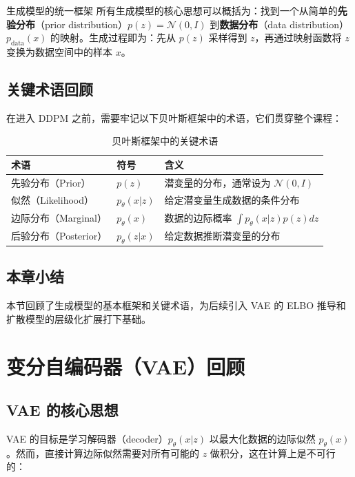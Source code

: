 \documentclass[a4paper]{article}
\begin{document}
\begin{knowledgebox}{生成模型的统一框架}
所有生成模型的核心思想可以概括为：找到一个从简单的\textbf{先验分布}（prior distribution）$p(z) = \mathcal{N}(0, I)$ 到\textbf{数据分布}（data distribution）$p_{\text{data}}(x)$ 的映射。生成过程即为：先从 $p(z)$ 采样得到 $z$，再通过映射函数将 $z$ 变换为数据空间中的样本 $x$。
\end{knowledgebox}

\subsection{关键术语回顾}

在进入 DDPM 之前，需要牢记以下贝叶斯框架中的术语，它们贯穿整个课程：

\begin{table}[H]
\centering
\begin{tabular}{lll}
\toprule
\textbf{术语} & \textbf{符号} & \textbf{含义} \\
\midrule
先验分布（Prior） & $p(z)$ & 潜变量的分布，通常设为 $\mathcal{N}(0, I)$ \\
似然（Likelihood） & $p_\theta(x|z)$ & 给定潜变量生成数据的条件分布 \\
边际分布（Marginal） & $p_\theta(x)$ & 数据的边际概率 $\int p_\theta(x|z)p(z)dz$ \\
后验分布（Posterior） & $p_\theta(z|x)$ & 给定数据推断潜变量的分布 \\
\bottomrule
\end{tabular}
\caption{贝叶斯框架中的关键术语}
\end{table}

\subsection{本章小结}

本节回顾了生成模型的基本框架和关键术语，为后续引入 VAE 的 ELBO 推导和扩散模型的层级化扩展打下基础。


\section{变分自编码器（VAE）回顾}

\subsection{VAE 的核心思想}

VAE 的目标是学习解码器（decoder）$p_\theta(x|z)$ 以最大化数据的边际似然 $p_\theta(x)$。然而，直接计算边际似然需要对所有可能的 $z$ 做积分，这在计算上是不可行的：
\end{document}

